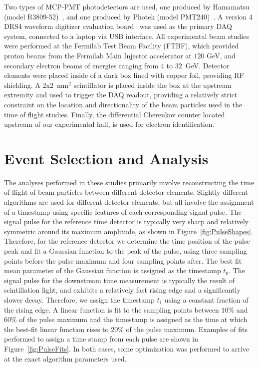 \documentclass[12pt]{article}
\begin{document}
Two types of MCP-PMT photodetectors are used, one produced by Hamamatsu (model
R3809-52)~\cite{HamamatsuMCP3809}, and one produced by Photek (model
PMT240)~\cite{Photek240}. A version 4 DRS4 waveform digitizer evaluation
board~\cite{DRS4} was used as the primary DAQ system, connected to a laptop via
USB interface. All experimental beam studies were performed at the Fermilab Test
Beam Facility (FTBF), which provided proton beams from the Fermilab Main
Injector accelerator at $120$ GeV, and secondary electron beams of energies
ranging from $4$ to $32$~GeV. Detector elements were placed inside of a dark box
lined with copper foil, providing RF shielding. A $2$x$2$~$\mathrm{mm}^{2}$
scintillator is placed inside the box at the upstream extremity and used to
trigger the DAQ readout, providing a relatively strict constraint on the
location and directionality of the beam particles used in the time of flight
studies. Finally, the differential Cherenkov counter located upstream of our
experimental hall, is used for electron identification. 

\section{Event Selection and Analysis}

The analyses performed in these studies primarily involve reconstructing the
time of flight of beam particles between different detector elements. Slightly
different algorithms are used for different detector elements, but all involve
the assignment of a timestamp using specific features of each corresponding
signal pulse. The signal pulse for the reference time detector is typically very
sharp and relatively symmetric around its maximum amplitude, as shown in
Figure~\ref{fig:PulseShapes}. Therefore, for the reference detector we determine
the time position of the pulse peak and fit a Gaussian function to the peak of
the pulse, using three sampling points before the pulse maximum and four
sampling points after. The best fit mean parameter of the Gaussian function is
assigned as the timestamp $t_{0}$. The signal pulse for the downstream time
measurement is typically the result of scintillation light, and exhibits a
relatively fast rising edge and a significantly slower decay. Therefore, we
assign the timestamp $t_{1}$ using a constant fraction of the rising edge. A
linear function is fit to the sampling points between $10\%$ and $60\%$ of the
pulse maximum and the timestamp is assigned as the time at which the best-fit
linear function rises to $20\%$ of the pulse maximum. Examples of fits performed
to assign a time stamp from each pulse are shown in Figure~\ref{fig:PulseFits}.
In both cases, some optimization was performed to arrive at the exact algorithm
parameters used.
\end{document}
